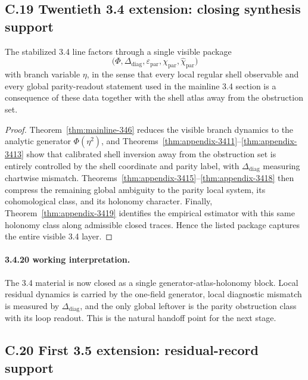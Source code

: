 \subsection*{C.19 Twentieth 3.4 extension: closing synthesis support}

\begin{theorem}
\label{thm:appendix-3420}
The stabilized 3.4 line factors through a single visible package
\[
  \bigl(\Phi,\Delta_{\mathrm{diag}},\varepsilon_{\mathrm{par}},\chi_{\mathrm{par}},\widehat\chi_{\mathrm{par}}\bigr)
\]
with branch variable $\eta$, in the sense that every local regular shell observable and every global parity-readout statement used in the mainline 3.4 section is a consequence of these data together with the shell atlas away from the obstruction set.
\end{theorem}

\begin{proof}
Theorem~\ref{thm:mainline-346} reduces the visible branch dynamics to the analytic generator $\Phi(\eta^2)$, and Theorems~\ref{thm:appendix-3411}--\ref{thm:appendix-3413} show that calibrated shell inversion away from the obstruction set is entirely controlled by the shell coordinate and parity label, with $\Delta_{\mathrm{diag}}$ measuring chartwise mismatch. Theorems~\ref{thm:appendix-3415}--\ref{thm:appendix-3418} then compress the remaining global ambiguity to the parity local system, its cohomological class, and its holonomy character. Finally, Theorem~\ref{thm:appendix-3419} identifies the empirical estimator with this same holonomy class along admissible closed traces. Hence the listed package captures the entire visible 3.4 layer.
\end{proof}

\paragraph{3.4.20 working interpretation.}
The 3.4 material is now closed as a single generator-atlas-holonomy block. Local residual dynamics is carried by the one-field generator, local diagnostic mismatch is measured by $\Delta_{\mathrm{diag}}$, and the only global leftover is the parity obstruction class with its loop readout. This is the natural handoff point for the next stage.


\subsection*{C.20 First 3.5 extension: residual-record support}

